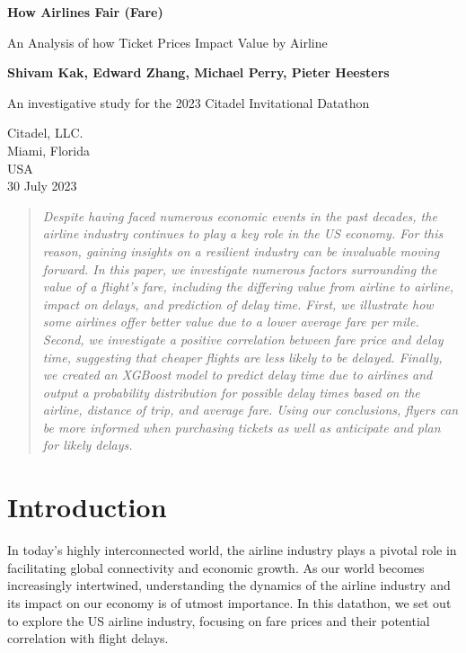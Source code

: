 \documentclass{article}
\begin{document}
\begin{titlepage}
   \begin{center}
       \vspace*{1cm}

       \textbf{How Airlines  Fair (Fare)}

       \vspace{0.5cm}
An Analysis of how Ticket Prices Impact Value by Airline            
       \vspace{1.5cm}

       \textbf{Shivam Kak, Edward Zhang, Michael Perry, Pieter Heesters}

       \vfill
            
       An investigative study for the 2023 Citadel Invitational Datathon
            
       \vspace{0.8cm}
     
            
       Citadel, LLC.\\
       Miami, Florida\\
       USA\\
       30 July 2023
            
   \end{center}
\end{titlepage}


\begin{abstract}
    \textit{Despite having faced numerous economic events in the past decades, the airline industry continues to play a key role in the US economy. For this reason, gaining insights on a resilient industry can be invaluable moving forward. In this paper, we investigate numerous factors surrounding the value of a flight's fare, including the differing value from airline to airline, impact on delays, and prediction of delay time. First, we illustrate how some airlines offer better value due to a lower average fare per mile. Second, we investigate a positive correlation between fare price and delay time, suggesting that cheaper flights are less likely to be delayed. Finally, we created an XGBoost model to predict delay time due to airlines and output a probability distribution for possible delay times based on the airline, distance of trip, and average fare. Using our conclusions, flyers can be more informed when purchasing tickets as well as anticipate and plan for likely delays. }
\end{abstract}
\section{Introduction}
In today's highly interconnected world, the airline industry plays a pivotal role in facilitating global connectivity and economic growth. As our world becomes increasingly intertwined, understanding the dynamics of the airline industry and its impact on our economy is of utmost importance. In this datathon, we set out to explore the US airline industry, focusing on fare prices and their potential correlation with flight delays.
\end{document}
